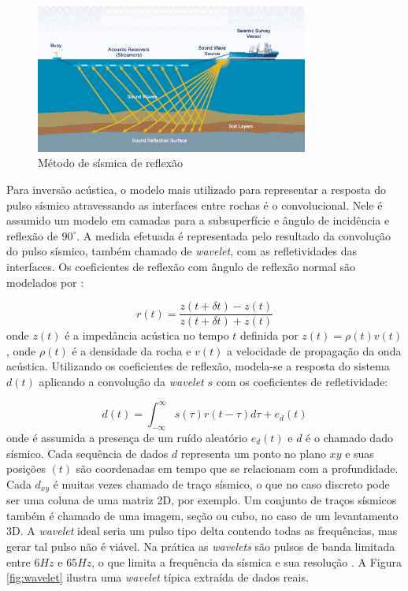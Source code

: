 \begin{figure}[ht!]
\begin{center}
  \includegraphics[width=0.8\textwidth]{fig/seismic_survey}
  \caption{Método de sísmica de reflexão \citep{figsismica}}
  \label{fig:1sismica}
\end{center}
\end{figure}


Para inversão acústica, o modelo mais utilizado para representar a resposta do
pulso sísmico atravessando as interfaces entre rochas é o convolucional. Nele é
assumido um modelo em camadas para a subsuperfície e ângulo de incidência e
reflexão de $90^\circ$. A medida efetuada é representada pelo resultado da
convolução do pulso sísmico, também chamado de \textit{wavelet}, com as
refletividades das interfaces. Os coeficientes de reflexão com ângulo de
reflexão normal são modelados por \citep[p. 69]{sen_livro}:

\begin{equation}
r(t) = \frac{z(t+\delta t)-z(t)}{z(t+\delta t)+z(t)}
\end{equation}
onde $z(t)$ é a impedância acústica no tempo $t$ definida por
$z(t)=\rho(t)v(t)$, onde $\rho(t)$ é a densidade da rocha e $v(t)$ a
velocidade de propagação da onda acústica. Utilizando os coeficientes de
reflexão, modela-se a resposta do sistema $d(t)$ aplicando a convolução
da \textit{wavelet} $s$ com os coeficientes de refletividade:

\begin{equation}
d(t) = \int_{-\infty}^{\infty} s(\tau)r(t-\tau)d\tau + e_d(t)
\end{equation}
onde é assumida a presença de um ruído aleatório $e_d(t)$ e $d$ é o chamado dado
sísmico. Cada sequência de dados $d$ representa um ponto no plano $xy$ e suas
posições $(t)$ são coordenadas em tempo que se relacionam com a profundidade.
Cada $d_{xy}$ é muitas vezes chamado de traço sísmico, o que no caso discreto
pode ser uma coluna de uma matriz 2D, por exemplo. Um conjunto de traços
sísmicos também é chamado de uma imagem, seção ou cubo, no caso de um
levantamento 3D. A \textit{wavelet} ideal seria um pulso tipo delta contendo
todas as frequências, mas gerar tal pulso não é viável. Na prática as
\textit{wavelets} são pulsos de banda limitada entre $6Hz$ e $65Hz$, o que
limita a frequência da sísmica e sua resolução \citep[p. 11]{sen_livro}.
A Figura \ref{fig:wavelet} ilustra uma \textit{wavelet} típica extraída de dados
reais.

